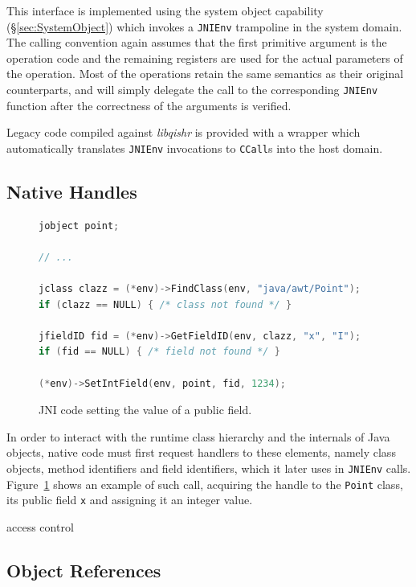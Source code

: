 \documentclass[a4paper,12pt,twoside,openright]{report}
\newcommand{\insn}[1]{\texttt{#1}}
\newcommand{\keyword}[1]{\textsf{#1}}
\newcommand{\class}[1]{\texttt{#1}}
\newcommand{\tool}[1]{\emph{#1}}
\newcommand{\lib}[1]{\tool{lib#1}}
\begin{document}
This interface is implemented using the system object capability (\S\ref{sec:SystemObject}) which invokes a \texttt{JNIEnv} trampoline in the system domain. The calling convention again assumes that the first primitive argument is the operation code and the remaining registers are used for the actual parameters of the operation. Most of the operations retain the same semantics as their original counterparts, and will simply delegate the call to the corresponding \texttt{JNIEnv} function after the correctness of the arguments is verified. 

Legacy code compiled against \lib{qishr} is provided with a wrapper which automatically translates \texttt{JNIEnv} invocations to \insn{CCall}s into the host domain.

\subsection{Native Handles}
\label{sec:MemorySafety}
\label{sec:CapabilityManager}

\begin{figure}[t]
	\begin{lstlisting}[language=C]
jobject point;

// ...

jclass clazz = (*env)->FindClass(env, "java/awt/Point");
if (clazz == NULL) { /* class not found */ }

jfieldID fid = (*env)->GetFieldID(env, clazz, "x", "I");
if (fid == NULL) { /* field not found */ }

(*env)->SetIntField(env, point, fid, 1234);
	\end{lstlisting}
	\caption{JNI code setting the value of a public field.}
	\label{listing:SetFieldValue}
\end{figure}

In order to interact with the runtime class hierarchy and the internals of Java objects, native code must first request handlers to these elements, namely class objects, method identifiers and field identifiers, which it later uses in \texttt{JNIEnv} calls. Figure~\ref{listing:SetFieldValue} shows an example of such call, acquiring the handle to the \class{Point} class, its \keyword{public} field \texttt{x} and assigning it an integer value.

access control

\subsection{Object References}
\end{document}
